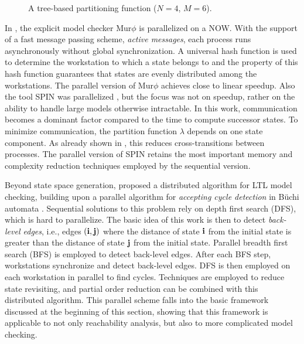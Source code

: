 \documentclass[copyright,creativecommons]{eptcs}
\newcommand{\CENTERPSSCALE}[2]{\begin{center}\mbox{\epsfig{file=#1.eps, scale=#2}}\end{center}}
\begin{document}
\begin{figure}
\begin{center}
\CENTERPSSCALE{treepartitioning}{0.65}
\end{center}
\caption{A tree-based partitioning function ($N = 4$, $M = 6$).}
\label{FIG:treepartitioning}
\end{figure}

In \cite{Stern97murphi}, the explicit model checker Mur$\phi$ is
parallelized on a NOW. With the support of a fast message passing
scheme, \emph{active messages}, each process runs asynchronously
without global synchronization. A universal hash function is used to
determine the workstation to which a state belongs to and the
property of this hash function guarantees that states are
evenly distributed among the workstations.
The parallel version of Mur$\phi$ achieves close to linear speedup.
Also the tool SPIN was parallelized \cite{Lerda99}, but the focus was not on
speedup, rather on the ability to handle large models otherwise intractable.
In this work, communication becomes a dominant factor
compared to the time to compute successor states.
To minimize communication, the partition function $\lambda$ depends on one
state component.
As already shown in \cite{1998INFORMSJC-DistrGen},
this reduces cross-transitions between processes.
The parallel version of SPIN retains the most important memory and complexity
reduction techniques employed by the sequential version.

Beyond state space generation, \cite{BarnatBR05} proposed a
distributed algorithm for LTL model checking, building upon
a parallel algorithm for \emph{accepting cycle detection} in
B\"{u}chi automata \cite{BarnatASE03}.
Sequential solutions to this problem rely on depth first search (DFS),
which is hard to parallelize.
The basic idea of this work is then to detect \emph{back-level edges},
i.e., edges $(\mathbf{i},\mathbf{j})$ where the distance of state $\mathbf{i}$ from the initial
state is greater than the distance of state $\mathbf{j}$ from the initial state.
Parallel breadth first search (BFS) is employed to
detect back-level edges.
After each BFS step, workstations synchronize and detect back-level edges.
DFS is then employed on each workstation in parallel to find cycles.
Techniques are employed to reduce state revisiting,
and partial order reduction can be combined with this distributed algorithm.
This parallel scheme falls into the basic framework
discussed at the beginning of this section, showing that
this framework is applicable to not only reachability analysis,
but also to more complicated model checking.
\end{document}
